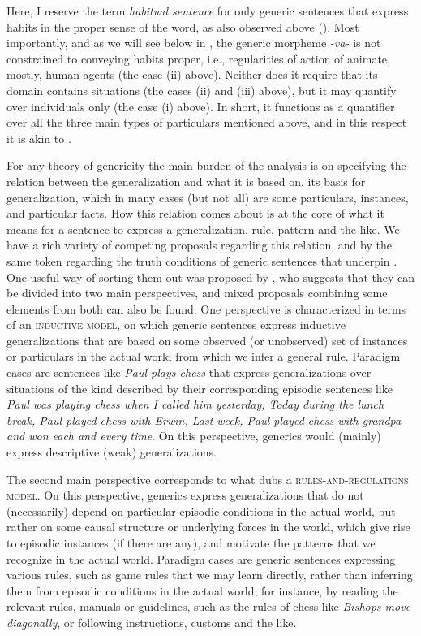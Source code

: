 \documentclass[output=paper,colorlinks,citecolor=brown]{langscibook}
\begin{document}
\newpage
\noindent Here,  I reserve the term \textit{habitual sentence} for only generic sentences that express habits in the proper sense of the word,
as also observed above (). Most importantly, 
and as we will see below in , 
the generic morpheme \textit{-va-} is not constrained to conveying habits proper, i.e., regularities of action of animate, mostly, human agents (the case (ii) above).  
Neither does it require that its domain contains situations
(the cases (ii) and (iii) above), but it may quantify
over individuals only (the case (i) above). In short, 
it functions as a quantifier over all the three main types of 
particulars mentioned above, and in this respect it
is akin to . 

For any theory of genericity
the main burden of the analysis is on specifying the relation between the generalization and
what it is based on, its basis for generalization, 
which in many cases (but not all) are some particulars, instances, and particular facts. 
How this relation comes about is at the core of 
what it means for a sentence to express a generalization,
rule, pattern and the like. We have a rich variety of competing proposals regarding this relation, and by the same token regarding the truth conditions of generic sentences that underpin . One useful way of sorting them out was proposed by \citet{carlson1995truth}, who suggests that they can be divided into two main perspectives, and mixed proposals combining some elements from both
can also be found.
One perspective is characterized in terms of an \textsc{inductive model}, on which 
generic sentences express inductive generalizations that are based on some observed (or unobserved) set of instances or particulars in the actual world from which we infer a general rule. Paradigm cases are sentences like \textit{Paul plays chess} that express generalizations over situations of the kind described by their corresponding episodic sentences like \textit{Paul was playing chess when I called him yesterday, Today during the lunch break, Paul played chess with Erwin, Last week, Paul played chess with grandpa and won each and every time}.  On this perspective, generics would (mainly) express descriptive (weak) generalizations. 

The second main perspective corresponds to what \citet{carlson1995truth} dubs a \textsc{rules-and-regulations model}. On this perspective, generics express generalizations that do not (necessarily) depend on particular episodic conditions in the actual world, but rather on some causal structure or underlying forces in the world, which give rise to episodic instances (if there are any), and motivate the patterns that we recognize in the actual world. 
Paradigm cases are generic sentences expressing various rules, such as game rules that we may learn directly, rather than inferring them from episodic conditions in the actual world,
for instance, by reading
the relevant rules, manuals or guidelines, such as the rules of chess like \textit{Bishops move diagonally}, or following instructions, customs and the like.
 
\end{document}
